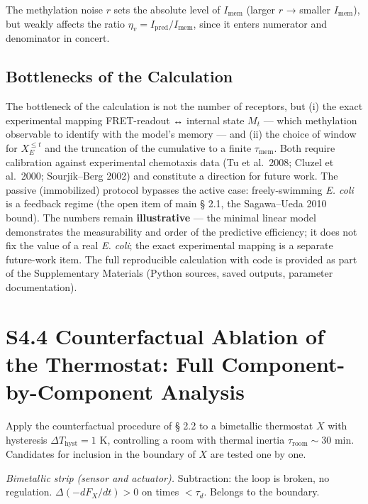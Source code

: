 \documentclass[pdflatex,sn-mathphys-ay]{sn-jnl}
\begin{document}
The methylation noise \(r\) sets the absolute level of \(I_{\text{mem}}\) (larger \(r\) → smaller \(I_{\text{mem}}\)), but weakly affects the ratio \(\eta_v = I_{\text{pred}}/I_{\text{mem}}\), since it enters numerator and denominator in concert.

\subsection*{Bottlenecks of the Calculation}\label{bottlenecks-of-the-calculation}

The bottleneck of the calculation is not the number of receptors, but (i) the exact experimental mapping FRET-readout ↔ internal state \(M_t\) --- which methylation observable to identify with the model's memory --- and (ii) the choice of window for \(X_E^{\le t}\) and the truncation of the cumulative to a finite \(\tau_{\text{mem}}\). Both require calibration against experimental chemotaxis data (Tu et al.~2008; Cluzel et al.~2000; Sourjik--Berg 2002) and constitute a direction for future work. The passive (immobilized) protocol bypasses the active case: freely-swimming \emph{E. coli} is a feedback regime (the open item of main § 2.1, the Sagawa--Ueda 2010 bound). The numbers remain \textbf{illustrative} --- the minimal linear model demonstrates the measurability and order of the predictive efficiency; it does not fix the value of a real \emph{E. coli}; the exact experimental mapping is a separate future-work item. The full reproducible calculation with code is provided as part of the Supplementary Materials (Python sources, saved outputs, parameter documentation).

\section*{S4.4 Counterfactual Ablation of the Thermostat: Full Component-by-Component Analysis}\label{s4.4-counterfactual-ablation-of-the-thermostat-full-component-by-component-analysis}

Apply the counterfactual procedure of § 2.2 to a bimetallic thermostat \(X\) with hysteresis \(\Delta T_{\text{hyst}} = 1\) K, controlling a room with thermal inertia \(\tau_{\text{room}} \sim 30\) min. Candidates for inclusion in the boundary of \(X\) are tested one by one.

\emph{Bimetallic strip (sensor and actuator).} Subtraction: the loop is broken, no regulation. \(\Delta(-dF_X/dt) > 0\) on times \(< \tau_d\). Belongs to the boundary.
\end{document}
